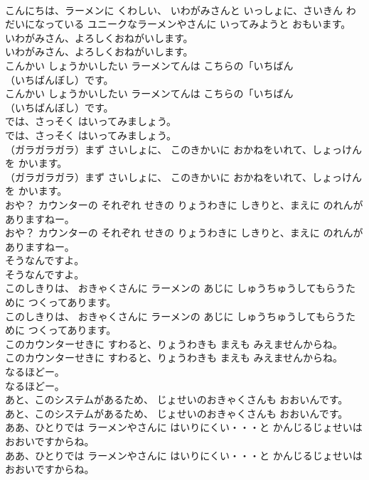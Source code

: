 \documentclass[8pt]{extreport}
\begin{document}
\begin{CJK}{UTF8}{min}
\\	こんにちは、ラーメンに くわしい、 いわがみさんと いっしょに、さいきん わだいになっている ユニークなラーメンやさんに いってみようと おもいます。
\\	いわがみさん、よろしくおねがいします。
\\	いわがみさん、よろしくおねがいします。
\\	こんかい しょうかいしたい ラーメンてんは こちらの「いちばん
\\	（いちばんぼし）です。
\\	こんかい しょうかいしたい ラーメンてんは こちらの「いちばん
\\	（いちばんぼし）です。
\\	では、さっそく はいってみましょう。
\\	では、さっそく はいってみましょう。
\\	（ガラガラガラ）まず さいしょに、 このきかいに おかねをいれて、しょっけんを かいます。
\\	（ガラガラガラ）まず さいしょに、 このきかいに おかねをいれて、しょっけんを かいます。
\\	おや？ カウンターの それぞれ せきの りょうわきに しきりと、まえに のれんが ありますねー。
\\	おや？ カウンターの それぞれ せきの りょうわきに しきりと、まえに のれんが ありますねー。
\\	そうなんですよ。
\\	そうなんですよ。
\\	このしきりは、 おきゃくさんに ラーメンの あじに しゅうちゅうしてもらうために つくってあります。
\\	このしきりは、 おきゃくさんに ラーメンの あじに しゅうちゅうしてもらうために つくってあります。
\\	このカウンターせきに すわると、りょうわきも まえも みえませんからね。
\\	このカウンターせきに すわると、りょうわきも まえも みえませんからね。
\\	なるほどー。
\\	なるほどー。
\\	あと、このシステムがあるため、 じょせいのおきゃくさんも おおいんです。
\\	あと、このシステムがあるため、 じょせいのおきゃくさんも おおいんです。
\\	ああ、ひとりでは ラーメンやさんに はいりにくい・・・と かんじるじょせいは おおいですからね。
\\	ああ、ひとりでは ラーメンやさんに はいりにくい・・・と かんじるじょせいは おおいですからね。

\end{CJK}
\end{document}
